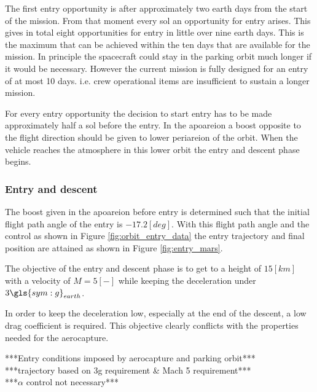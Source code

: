 The first entry opportunity is after approximately two earth days from the start of the mission. From that moment every sol an opportunity for entry arises. This gives in total eight opportunities for entry in little over nine earth days. This is the maximum that can be achieved within the ten days that are available for the mission. In principle the spacecraft could stay in the parking orbit much longer if it would be necessary. However the current mission is fully designed for an entry of at most 10 days. i.e. crew operational items are insufficient to sustain a longer mission.

For every entry opportunity the decision to start entry has to be made approximately half a sol before the entry. In the apoareion a boost opposite to the flight direction should be given to lower periareion of the orbit.  When the vehicle reaches the atmosphere in this lower orbit the entry and descent phase begins. 

\subsubsection{Entry and descent}\label{sec:entry_descent}
The boost given in the apoareion before entry is determined such that the initial flight path angle of the entry is $-17.2 \left[deg\right]$. With this flight path angle and the control as shown in Figure \ref{fig:orbit_entry_data} the entry trajectory and final position are attained as shown in Figure \ref{fig:entry_mars}.

The objective of the entry and descent phase is to get to a height of $15 \left[km\right]$ with a velocity of $M = 5 \left[-\right]$ while keeping the deceleration under $3 \gls{sym:g}_{earth}$.

In order to keep the deceleration low, especially at the end of the descent, a low drag coefficient is required. This objective clearly conflicts with the properties needed for the aerocapture.  

***Entry conditions imposed by aerocapture and parking orbit***\\
***trajectory based on 3g requirement \& Mach 5 requirement***\\
***$\alpha$ control not necessary***\\

